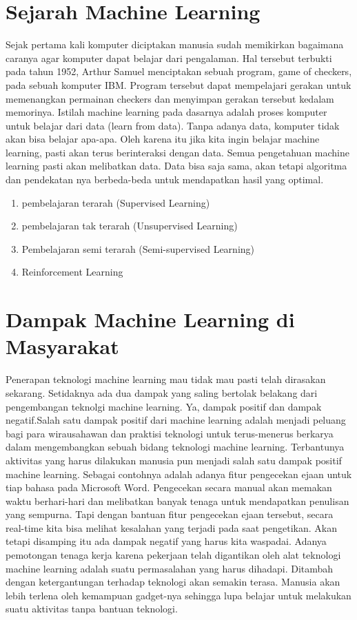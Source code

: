 \section{Sejarah Machine Learning}
Sejak pertama kali komputer diciptakan manusia sudah memikirkan bagaimana caranya agar komputer dapat belajar dari pengalaman. Hal tersebut terbukti pada tahun 1952, Arthur Samuel menciptakan 
sebuah program, game of checkers, pada sebuah komputer IBM. Program tersebut dapat mempelajari gerakan untuk memenangkan permainan checkers dan menyimpan gerakan tersebut kedalam memorinya.
Istilah machine learning pada dasarnya adalah proses komputer untuk belajar dari data (learn from data). Tanpa adanya data, komputer tidak akan bisa belajar apa-apa. Oleh karena itu jika kita ingin belajar machine learning, pasti akan terus berinteraksi dengan data. Semua pengetahuan machine learning pasti akan melibatkan data. Data bisa saja sama, akan tetapi algoritma dan pendekatan nya berbeda-beda untuk mendapatkan hasil yang optimal.
\begin{enumerate}
	\item pembelajaran terarah (Supervised Learning)
	\item pembelajaran tak terarah (Unsupervised Learning)
	\item Pembelajaran semi terarah (Semi-supervised Learning)
	\item Reinforcement Learning
\end{enumerate}
\section{Dampak Machine Learning di Masyarakat}
Penerapan teknologi machine learning mau tidak mau pasti telah dirasakan sekarang. Setidaknya ada dua dampak yang saling bertolak belakang dari pengembangan teknolgi machine learning. Ya, dampak positif dan dampak negatif.Salah satu dampak positif dari machine learning adalah menjadi peluang bagi para wirausahawan dan praktisi teknologi untuk terus-menerus berkarya dalam mengembangkan sebuah bidang teknologi machine learning. Terbantunya aktivitas yang harus dilakukan manusia pun menjadi salah satu dampak positif machine learning. Sebagai contohnya adalah adanya fitur pengecekan ejaan untuk tiap bahasa pada Microsoft Word. Pengecekan secara manual akan memakan waktu berhari-hari dan melibatkan banyak tenaga untuk mendapatkan penulisan yang sempurna. Tapi dengan bantuan fitur pengecekan ejaan tersebut, secara real-time kita bisa melihat kesalahan yang terjadi pada saat pengetikan.
Akan tetapi disamping itu ada dampak negatif yang harus kita waspadai. Adanya pemotongan tenaga kerja karena pekerjaan telah digantikan oleh alat teknologi machine learning adalah suatu permasalahan yang harus dihadapi. Ditambah dengan ketergantungan terhadap teknologi akan semakin terasa. Manusia akan lebih terlena oleh kemampuan gadget-nya sehingga lupa belajar untuk melakukan suatu aktivitas tanpa bantuan teknologi.
